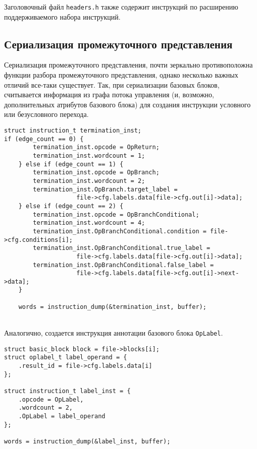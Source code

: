 \documentclass[14pt]{extarticle}
\begin{document}
Заголовочный файл \texttt{headers.h} также содержит инструкций по расширению поддерживаемого набора инструкций.
\subsection{Сериализация промежуточного представления}
Сериализация промежуточного представления, почти зеркально противоположна функции разбора промежуточного представления, однако несколько важных отличий все-таки существует. Так, при сериализации базовых блоков, считывается информация из графа потока управления (и, возможно, дополнительных атрибутов базового блока) для создания инструкции условного или безусловного перехода.
\begin{lstlisting}[caption={конструирование инструкции ветвления}]
struct instruction_t termination_inst;
if (edge_count == 0) {
        termination_inst.opcode = OpReturn;
        termination_inst.wordcount = 1;
    } else if (edge_count == 1) {
        termination_inst.opcode = OpBranch;
        termination_inst.wordcount = 2;
        termination_inst.OpBranch.target_label = 
                    file->cfg.labels.data[file->cfg.out[i]->data];
    } else if (edge_count == 2) {
        termination_inst.opcode = OpBranchConditional;
        termination_inst.wordcount = 4;
        termination_inst.OpBranchConditional.condition = file->cfg.conditions[i];
        termination_inst.OpBranchConditional.true_label =
                    file->cfg.labels.data[file->cfg.out[i]->data];
        termination_inst.OpBranchConditional.false_label =
                    file->cfg.labels.data[file->cfg.out[i]->next->data];
    }
    
    words = instruction_dump(&termination_inst, buffer);
\end{lstlisting}
~\\ %

Аналогично, создается инструкция аннотации базового блока \texttt{OpLabel}.
\begin{lstlisting}[caption={конструирование инструкции \texttt{OpLabel}}]
struct basic_block block = file->blocks[i];
struct oplabel_t label_operand = {
    .result_id = file->cfg.labels.data[i]
};
        
struct instruction_t label_inst = {
    .opcode = OpLabel,
    .wordcount = 2,
    .OpLabel = label_operand
};
        
words = instruction_dump(&label_inst, buffer);
\end{lstlisting}
~\\ %
\end{document}
